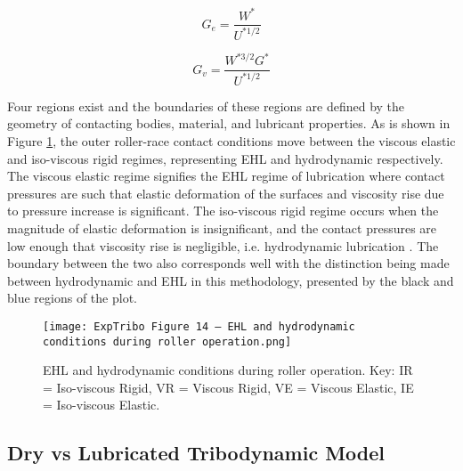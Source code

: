 \begin{equation}\label{GoharGe}
	G_e=\frac{W^*}{U^{* 1 / 2}}
\end{equation}

\begin{equation}\label{GoharGv}
	G_v=\frac{W^{* 3 / 2} G^*}{U^{* 1 / 2}}
\end{equation}

Four regions exist and the boundaries of these regions are defined by the geometry of contacting bodies, material, and lubricant properties. As is shown in Figure \ref{EHL and hydrodynamic conditions during roller operation}, the outer roller-race contact conditions move between the viscous elastic and iso-viscous rigid regimes, representing EHL and hydrodynamic respectively. The viscous elastic regime signifies the EHL regime of lubrication where contact pressures are such that elastic deformation of the surfaces and viscosity rise due to pressure increase is significant. The iso-viscous rigid regime occurs when the magnitude of elastic deformation is insignificant, and the contact pressures are low enough that viscosity rise is negligible, i.e. hydrodynamic lubrication \cite{Hamrock1980}. The boundary between the two also corresponds well with the distinction being made between hydrodynamic and EHL in this methodology, presented by the black and blue regions of the plot.

\begin{figure}
	\texttt{[image: ExpTribo Figure 14 – EHL and hydrodynamic conditions during roller operation.png]}
	\caption{EHL and hydrodynamic conditions during roller operation. Key: IR = Iso-viscous Rigid, VR = Viscous Rigid, VE = Viscous Elastic, IE = Iso-viscous Elastic.}
	\label{EHL and hydrodynamic conditions during roller operation}
\end{figure} 

\subsection{Dry vs Lubricated Tribodynamic Model}

